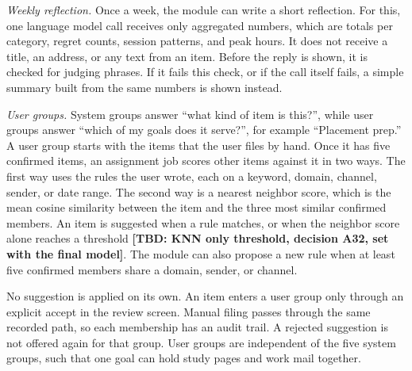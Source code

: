 \documentclass[conference]{IEEEtran}
\newcommand{\tbd}[1]{\textbf{[TBD: #1]}}
\begin{document}
\textit{Weekly reflection.} Once a week, the module can write a short reflection. For this, one language model call receives only aggregated numbers, which are totals per category, regret counts, session patterns, and peak hours. It does not receive a title, an address, or any text from an item. Before the reply is shown, it is checked for judging phrases. If it fails this check, or if the call itself fails, a simple summary built from the same numbers is shown instead.

\textit{User groups.} System groups answer ``what kind of item is this?'', while user groups answer ``which of my goals does it serve?'', for example ``Placement prep.'' A user group starts with the items that the user files by hand. Once it has five confirmed items, an assignment job scores other items against it in two ways. The first way uses the rules the user wrote, each on a keyword, domain, channel, sender, or date range. The second way is a nearest neighbor score, which is the mean cosine similarity between the item and the three most similar confirmed members. An item is suggested when a rule matches, or when the neighbor score alone reaches a threshold \tbd{KNN only threshold, decision A32, set with the final model}. The module can also propose a new rule when at least five confirmed members share a domain, sender, or channel.

No suggestion is applied on its own. An item enters a user group only through an explicit accept in the review screen. Manual filing passes through the same recorded path, so each membership has an audit trail. A rejected suggestion is not offered again for that group. User groups are independent of the five system groups, such that one goal can hold study pages and work mail together.

\end{document}
